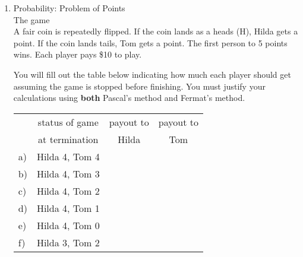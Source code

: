 \documentclass[12pt]{article}
\begin{document}
\begin{enumerate}
\item Probability: Problem of Points\\

The game\\
A fair coin is repeatedly flipped. If the coin lands as a heads (H), Hilda gets a point. If the coin lands tails, Tom gets a point. The first person to 5 points wins. Each player pays \$10 to play.

You will fill out the table below indicating how much each player should get assuming the game is stopped before finishing. You must justify your calculations using \textbf{both} Pascal's method and Fermat's method.\\

\bgroup
\def\arraystretch{1.5}
\begin{tabular}{l || c || c|c}
& status of game&payout to& payout to\\
&at termination& Hilda&Tom\\
\hline \hline
a)& Hilda 4, Tom 4 &&\\
\hline
b)& Hilda 4, Tom 3 &&\\
\hline
c)& Hilda 4, Tom 2 &&\\
\hline
d)& Hilda 4, Tom 1 &&\\
\hline
e)& Hilda 4, Tom 0 &&\\
\hline
f)& Hilda 3, Tom 2 &&\\
\hline
\end{tabular}
\egroup


\end{enumerate}
\end{document}
